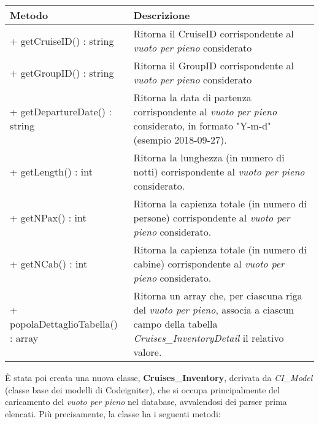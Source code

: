 \begin{center}
	\def\arraystretch{1.5}
	\begin{tabularx}{\columnwidth}{XX}
		\hline
		\textbf{Metodo} & \textbf{Descrizione} \\ \hline
		+ getCruiseID() : string & Ritorna il CruiseID corrispondente al \textit{vuoto per pieno} considerato\\
		\hline
		+ getGroupID() : string & Ritorna il GroupID corrispondente al \textit{vuoto per pieno} considerato\\
		\hline
		+ getDepartureDate() : string & Ritorna la data di partenza corrispondente al \textit{vuoto per pieno} considerato, in formato "Y-m-d" (esempio 2018-09-27).\\
		\hline
		+ getLength() : int & Ritorna la lunghezza (in numero di notti) corrispondente al \textit{vuoto per pieno} considerato.\\
		\hline
		+ getNPax() : int & Ritorna la capienza totale (in numero di persone) corrispondente al \textit{vuoto per pieno} considerato.\\
		\hline
		+ getNCab() : int & Ritorna la capienza totale (in numero di cabine) corrispondente al \textit{vuoto per pieno} considerato.\\
		\hline
		+ popolaDettaglioTabella() : array & Ritorna un array che, per ciascuna riga del \textit{vuoto per pieno}, associa a ciascun campo della tabella \textit{Cruises\_InventoryDetail} il relativo valore.\\
		\hline
	\end{tabularx}
\end{center}
È stata poi creata una nuova classe, \textbf{Cruises\_Inventory}, derivata da \textit{CI\_Model} (classe base dei modelli di Codeigniter), che si occupa principalmente del caricamento del \textit{vuoto per pieno} nel database, avvalendosi dei parser prima elencati. Più precisamente, la classe ha i seguenti metodi:
